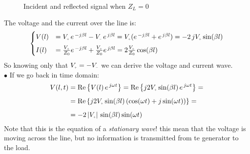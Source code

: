 \begin{figure}[H]
    \begin{center}
    \end{center}
    \caption{Incident and reflected signal when $Z_L=0$}\label{fig:signal_with_Z_0}
\end{figure}
The voltage and the current over the line is:
\begin{equation}
    \begin{cases}
      V(l)&=V\bottomPlus\,e^{\,-j\beta l}-V\bottomMinus\,e^{\,j\beta l}=V\bottomPlus(e^{\,-j\beta l}+e^{\,j\beta l})=-2\,jV\bottomPlus\sin (\beta l)\\[5pt]
      I(l)&=\frac{V\bottomPlus}{Z_0}e^{\,-j\beta l}+\frac{V\bottomPlus}{Z_0}e^{\,j\beta l}=2\frac{V\bottomPlus}{Z_0}\cos (\beta l)
    \end{cases}
\end{equation}
So knowing only that $V\bottomPlus=-V\bottomMinus$ we can derive the voltage and current wave.\\
$\bullet$ If we go back in time domain:
\begin{align}
    \begin{split}
      V(l,t)&=\operatorname{Re}\left\{V(l)\,e^{\,j\omega t}\right\}=\operatorname{Re}\left\{j 2V\bottomPlus\sin (\beta l)\,e^{\,j\omega t}\right\}=\\[5pt]
      &=\operatorname{Re}\left\{j2V\bottomPlus\sin(\beta l)\,(\cos(\omega t)+j\sin(\omega t))\right\}=\\[5pt]
      &=-2\,|V\bottomPlus|\,\sin(\beta l)\sin(\omega t)
    \end{split}
\end{align}
Note that this is the equation of a \emph{stationary wave}! this mean that the voltage is moving across the line, but no information is transmitted from te generator to the load.\\
